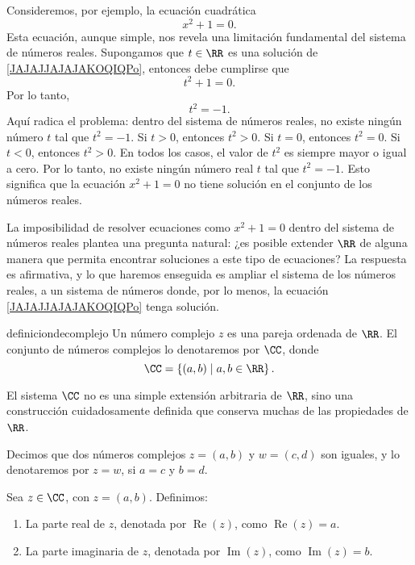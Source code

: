 Consideremos, por ejemplo, la ecuación cuadrática
\begin{equation}
    x^2 + 1 = 0. \label{JAJAJJAJAJAKOQIQPo}
\end{equation}
Esta ecuación, aunque simple, nos revela una limitación fundamental del sistema de números reales. Supongamos que $t \in \RR$ es una solución de \eqref{JAJAJJAJAJAKOQIQPo}, entonces debe cumplirse que
$$t^2 + 1 = 0.$$
Por lo tanto,
$$t^2 = -1.$$
Aquí radica el problema: dentro del sistema de números reales, no existe ningún número $t$ tal que $t^2 = -1$. Si $t > 0$, entonces $t^2 > 0$. Si $t = 0$, entonces $t^2 = 0$. Si $t < 0$, entonces $t^2 > 0$. En todos los casos, el valor de $t^2$ es siempre mayor o igual a cero. Por lo tanto, no existe ningún número real $t$ tal que $t^2 = -1$. Esto significa que la ecuación $x^2 + 1 = 0$ no tiene solución en el conjunto de los números reales.

La imposibilidad de resolver ecuaciones como $x^2 + 1 = 0$ dentro del sistema de números reales plantea una pregunta natural: ¿es posible extender $\RR$ de alguna manera que permita encontrar soluciones a este tipo de ecuaciones? La respuesta es afirmativa, y lo que haremos enseguida es ampliar el sistema de los números reales, a un sistema de números donde, por lo menos, la ecuación \eqref{JAJAJJAJAJAKOQIQPo} tenga solución.

\begin{definicion}{}{definiciondecomplejo}
    Un número complejo $z$ es una pareja ordenada de $\RR$. El conjunto de números complejos lo denotaremos por $\CC$, donde
    $$\CC = \left\{ (a, b) \mid a, b \in \RR \right\}.$$
\end{definicion}

El sistema $\CC$ no es una simple extensión arbitraria de $\RR$, sino una construcción cuidadosamente definida que conserva muchas de las propiedades de $\RR$.

\begin{definicion}{}{}
    Decimos que dos números complejos $z = (a, b)$ y $w = (c, d)$ son iguales, y lo denotaremos por $z = w$, si $a = c$ y $b = d$.
\end{definicion}

\begin{definicion}{}{}
    Sea $z \in \CC$, con $z = (a, b)$. Definimos:
    \begin{enumerate}[label=\roman*., topsep=6pt, itemsep=0pt]
        \item La parte real de $z$, denotada por $\operatorname{Re}(z)$, como $\operatorname{Re}(z) = a$.
        \item La parte imaginaria de $z$, denotada por $\operatorname{Im} (z)$, como $\operatorname{Im} (z) = b$.
    \end{enumerate}
\end{definicion}

